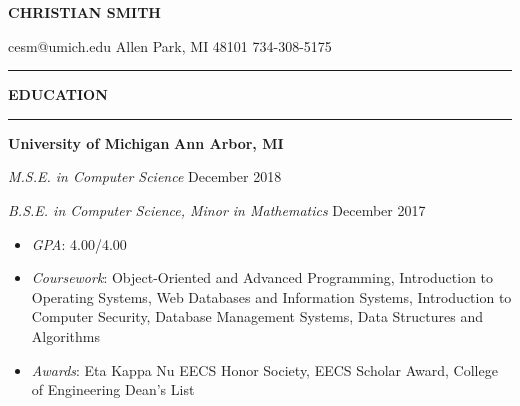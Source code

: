 \documentclass[10pt]{article}
\begin{document}
\setlength{\parskip}{1mm}

\newcommand{\name}[1]{
  \begin{center} \LARGE \textbf{#1} \end{center}
}

\newcommand{\contact}[1]{
  \begin{center} \large #1 \end{center}
}

\newcommand{\sectiontitle}[1]{
  \rule{\columnwidth}{1pt}
  \par\nointerlineskip
  { \large \textbf{#1} }
  \par\nointerlineskip
  \rule{\columnwidth}{3pt}\par
}

\newcommand{\employer}[2]{
  \noindent \textbf{#1} \hfill \textbf{#2} \par
}

\newcommand{\job}[2]{
  \noindent \textit{#1} \hfill #2 \par
}

\newcommand{\bullettitle}[1]{
  \textit{#1}:
}

\newenvironment{bullets}{
  \begin{itemize}
}{
  \end{itemize}
  \vspace{0.05in}
}

\name{CHRISTIAN SMITH}
\contact{cesm@umich.edu \textbar \hspace{0.1mm} Allen Park, MI 48101 \textbar \hspace{0.1mm} 734-308-5175}

\sectiontitle{EDUCATION}

\employer{University of Michigan}{Ann Arbor, MI}
\job{M.S.E. in Computer Science}{December 2018}
\job{B.S.E. in Computer Science, Minor in Mathematics}{December 2017}
\begin{bullets}
  \item \bullettitle{GPA} 4.00/4.00
  \item \bullettitle{Coursework} Object-Oriented and Advanced Programming, Introduction to Operating Systems,
        Web Databases and Information Systems, Introduction to Computer Security, Database Management Systems,
        Data Structures and Algorithms
  \item \bullettitle{Awards} Eta Kappa Nu EECS Honor Society, EECS Scholar Award, College of Engineering
      Dean's List
\end{bullets}
\end{document}
